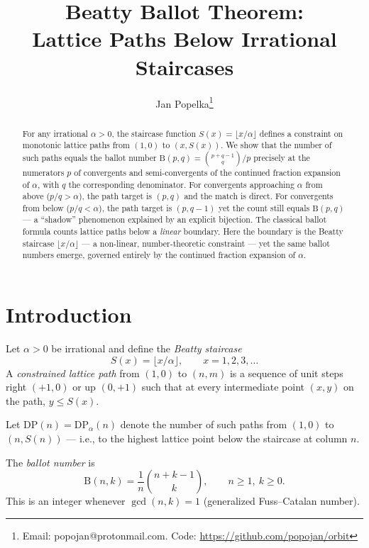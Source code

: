 \documentclass[11pt]{article}
\title{Beatty Ballot Theorem:\\Lattice Paths Below Irrational Staircases}
\author{Jan Popelka\thanks{Email: popojan@protonmail.com. Code: \url{https://github.com/popojan/orbit}}}
\date{}
\theoremstyle{definition}
\theoremstyle{remark}
\newcommand{\floor}[1]{\lfloor #1 \rfloor}
\newcommand{\B}{\mathrm{B}}
\begin{document}
\maketitle

\begin{abstract}
For any irrational $\alpha > 0$, the staircase function $S(x) = \floor{x/\alpha}$ defines a constraint on monotonic lattice paths from $(1,0)$ to $(x, S(x))$.
We show that the number of such paths equals the ballot number $\B(p,q) = \binom{p+q-1}{q}/p$ precisely at the numerators $p$ of convergents and semi-convergents of the continued fraction expansion of $\alpha$, with $q$ the corresponding denominator.
For convergents approaching $\alpha$ from above ($p/q > \alpha$), the path target is $(p, q)$ and the match is direct.
For convergents from below ($p/q < \alpha$), the path target is $(p, q-1)$ yet the count still equals $\B(p,q)$ --- a ``shadow'' phenomenon explained by an explicit bijection.
The classical ballot formula counts lattice paths below a \emph{linear} boundary.
Here the boundary is the Beatty staircase $\floor{x/\alpha}$ --- a non-linear, number-theoretic constraint --- yet the same ballot numbers emerge, governed entirely by the continued fraction expansion of $\alpha$.
\end{abstract}

\section{Introduction}

Let $\alpha > 0$ be irrational and define the \emph{Beatty staircase}
\begin{equation}\label{eq:staircase}
  S(x) = \floor{x / \alpha}, \qquad x = 1, 2, 3, \ldots
\end{equation}
A \emph{constrained lattice path} from $(1,0)$ to $(n, m)$ is a sequence of unit steps right $(+1,0)$ or up $(0,+1)$ such that at every intermediate point $(x, y)$ on the path, $y \leq S(x)$.

Let $\mathrm{DP}(n) = \mathrm{DP}_\alpha(n)$ denote the number of such paths from $(1,0)$ to $(n, S(n))$ --- i.e., to the highest lattice point below the staircase at column $n$.

The \emph{ballot number} is
\begin{equation}\label{eq:ballot}
  \B(n, k) = \frac{1}{n}\binom{n+k-1}{k}, \qquad n \geq 1,\ k \geq 0.
\end{equation}
This is an integer whenever $\gcd(n, k) = 1$ (generalized Fuss--Catalan number).
\end{document}
